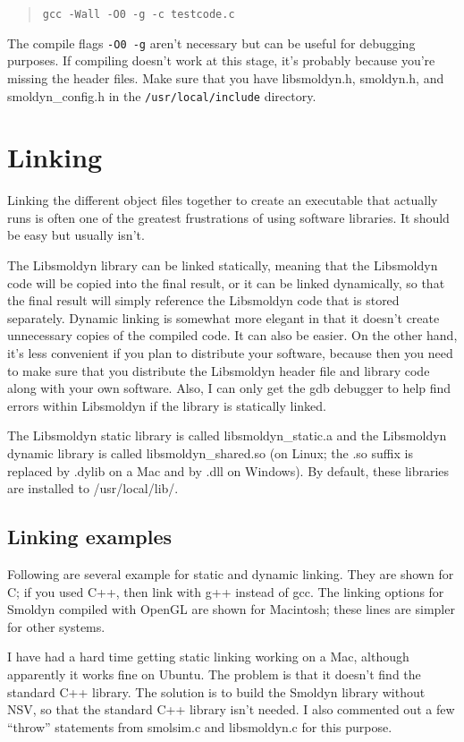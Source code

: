 \documentclass {book}
\begin{document}
\begin{quote}
\lstinline{gcc -Wall -O0 -g -c testcode.c}
\end{quote}

The compile flags \texttt{-O0 -g} aren't necessary but can be useful for debugging purposes. If compiling doesn't work at this stage, it's probably because you're missing the header files. Make sure that you have libsmoldyn.h, smoldyn.h, and smoldyn\_config.h in the \texttt{/usr/local/include} directory.

\section{Linking}

Linking the different object files together to create an executable that actually runs is often one of the greatest frustrations of using software libraries. It should be easy but usually isn't.

The Libsmoldyn library can be linked statically, meaning that the Libsmoldyn code will be copied into the final result, or it can be linked dynamically, so that the final result will simply reference the Libsmoldyn code that is stored separately. Dynamic linking is somewhat more elegant in that it doesn't create unnecessary copies of the compiled code. It can also be easier. On the other hand, it's less convenient if you plan to distribute your software, because then you need to make sure that you distribute the Libsmoldyn header file and library code along with your own software. Also, I can only get the gdb debugger to help find errors within Libsmoldyn if the library is statically linked.

The Libsmoldyn static library is called libsmoldyn\_static.a and the Libsmoldyn dynamic library is called libsmoldyn\_shared.so (on Linux; the .so suffix is replaced by .dylib on a Mac and by .dll on Windows). By default, these libraries are installed to /usr/local/lib/.

\subsection*{Linking examples}

Following are several example for static and dynamic linking. They are shown for C; if you used C++, then link with g++ instead of gcc. The linking options for Smoldyn compiled with OpenGL are shown for Macintosh; these lines are simpler for other systems.

I have had a hard time getting static linking working on a Mac, although apparently it works fine on Ubuntu. The problem is that it doesn't find the standard C++ library. The solution is to build the Smoldyn library without NSV, so that the standard C++ library isn't needed. I also commented out a few ``throw'' statements from smolsim.c and libsmoldyn.c for this purpose.
\end{document}
